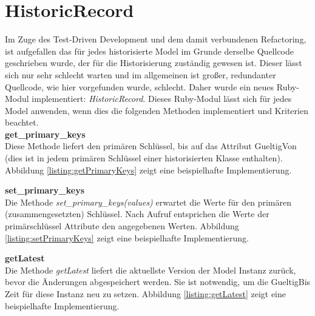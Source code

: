 \documentclass[12pt,             %
               a4paper,          %
               listof=totoc,     %
               index=totoc,      %
               bibliography=totoc,%
               oneside,         %
               BCOR1cm,          %
               english   %
               ]{scrbook}
\begin{document}
\section{HistoricRecord}
Im Zuge des Test-Driven Development und dem damit verbundenen Refactoring, ist aufgefallen das für jedes historisierte Model im Grunde derselbe Quellcode geschrieben wurde, der für die Historisierung zuständig gewesen ist. Dieser lässt sich nur sehr schlecht warten und im allgemeinen ist großer, redundanter Quellcode, wie hier vorgefunden wurde, schlecht. Daher wurde ein neues Ruby-Modul implementiert: \textit{HistoricRecord}. Dieses Ruby-Modul lässt sich für jedes Model anwenden, wenn dies die folgenden Methoden implementiert und Kriterien beachtet.\\

\textbf{get\_primary\_keys}\\
Diese Methode liefert den primären Schlüssel, bis auf das Attribut GueltigVon (dies ist in jedem primären Schlüssel einer historisierten Klasse enthalten). Abbildung \vref{listing:getPrimaryKeys} zeigt eine beispielhafte Implementierung.

\label{listing:getPrimaryKeys}

\textbf{set\_primary\_keys}\\
Die Methode \textit{set\_primary\_keys(values)} erwartet die Werte für den primären (zusammengesetzten) Schlüssel. Nach Aufruf entsprichen die Werte der primärschlüssel Attribute den angegebenen Werten. Abbildung \vref{listing:setPrimaryKeys} zeigt eine beispielhafte Implementierung.

\label{listing:setPrimaryKeys}

\textbf{getLatest}\\
Die Methode \textit{getLatest} liefert die aktuellste Version der Model Instanz zurück, bevor die Änderungen abgespeichert werden. Sie ist notwendig, um die GueltigBis Zeit für diese Instanz neu zu setzen. Abbildung \vref{listing:getLatest} zeigt eine beispielhafte Implementierung.

\label{listing:getLatest}
\end{document}
